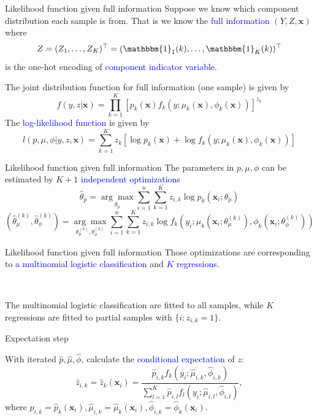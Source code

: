 \documentclass[professionalfont]{beamer}
\def\bx{\boldsymbol{x}}
\newcommand{\blue}[1]{\textcolor{blue}{#1}}
\begin{document}
\begin{frame}{Likelihood function given full information}
Suppose we know which component distribution each sample is from. That is we know the \blue{full information} $(Y,Z,\bx)$ where
$$Z=(Z_1,\ldots,Z_K)^\top=(\mathbbm{1}_1(k),\ldots,\mathbbm{1}_K(k))^\top$$
is the one-hot encoding of \blue{component indicator variable}.


The joint distribution function for full information (one sample) is given by
	$$f(y,z|
	\bx) = \prod_{k=1}^K\left[p_k(\bx)f_k(y;\mu_k(\bx),\phi_k(\bx))\right]^{z_k}$$
The \blue{log-likelihood function} is given by
\begin{equation}\label{full-L}
		l(p,\mu,\phi|y,z,\bx)=\sum_{k=1}^K z_k\left[\log p_k(\bx) + \log f_k(y;\mu_k(\bx),\phi_k(\bx))\right]
\end{equation}
\end{frame}

\begin{frame}{Likelihood function given full information}
	The parameters in $p,\mu,\phi$ can be estimated by $K+1$ \blue{independent optimizations}
	\begin{equation}\label{p-reg}
		\hat{\theta}_p=\underset{\theta_p}{\arg\max}\sum_{i=1}^n\sum_{k=1}^Kz_{i,k}\log p_k(\bx_i;\theta_p)
	\end{equation}
	\begin{equation}\label{comp-reg}
		\left(\hat{\theta}_\mu^{(k)},\hat{\theta}_\phi^{(k)}\right)=\underset{\theta^{(k)}_\mu,\theta^{(k)}_\phi}{\arg\max}\sum_{i=1}^n\sum_{k=1}^Kz_{i,k}\log f_k\left(y_i;\mu_k\left(\bx_i;\theta_\mu^{(k)}\right),\phi_k\left(\bx_i;\theta_\phi^{(k)}\right)\right)
	\end{equation}
\end{frame}

\begin{frame}{Likelihood function given full information}
Those optimizations are corresponding to  \blue{a multinomial logistic classification} and \blue{$K$ regressions}.

~

The multinomial logistic classification are fitted to all samples, while $K$ regressions are fitted to {partial} samples with $\{i:z_{i,k}=1\}$.
\end{frame}

\begin{frame}{Expectation step}


	With iterated $\hat{p},\hat{\mu},\hat{\phi}$, calculate the \blue{conditional expectation} of $z$:
		$$\hat{z}_{i,k}=\hat{z}_k(\bx_i)=\frac{\hat{p}_{i,k}f_k(y_i;\hat{\mu}_{i,k},\hat{\phi}_{i,k})}{\sum_{l=1}^K\hat{p}_{i,l}f_l(y_i;\hat{\mu}_{i,l},\hat{\phi}_{i,l})},$$
		where
		$\hat{p}_{i,k}=\hat{p}_k(\bx_i),\hat{\mu}_{i,k}=\hat{\mu}_k(\bx_i),\hat{\phi}_{i,k}=\hat{\phi}_k(\bx_i)$.
\end{frame}
\end{document}
